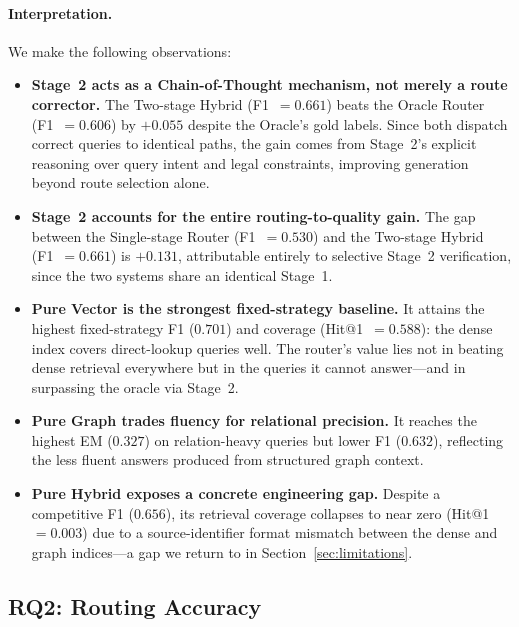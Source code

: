 ﻿\documentclass[11pt,twocolumn]{article}
\begin{document}
\paragraph{Interpretation.}
We make the following observations:
\begin{itemize}
  \item \textbf{Stage~2 acts as a Chain-of-Thought mechanism, not merely
  a route corrector.} The Two-stage Hybrid (F1~$=0.661$) beats the
  Oracle Router (F1~$=0.606$) by $+0.055$ despite the Oracle's gold labels.
  Since both dispatch correct queries to identical paths, the gain comes
  from Stage~2's explicit reasoning over query intent and legal
  constraints, improving generation beyond route selection alone.

  \item \textbf{Stage~2 accounts for the entire routing-to-quality gain.}
  The gap between the Single-stage Router (F1~$=0.530$) and the Two-stage
  Hybrid (F1~$=0.661$) is $+0.131$, attributable entirely to selective
  Stage~2 verification, since the two systems share an identical Stage~1.

  \item \textbf{Pure Vector is the strongest fixed-strategy baseline.}
  It attains the highest fixed-strategy F1 ($0.701$) and coverage
  (Hit@1~$=0.588$): the dense index covers direct-lookup queries well. The
  router's value lies not in beating dense retrieval everywhere but in the
  queries it cannot answer---and in surpassing the oracle via Stage~2.

  \item \textbf{Pure Graph trades fluency for relational precision.} It
  reaches the highest EM ($0.327$) on relation-heavy queries but lower
  F1 ($0.632$), reflecting the less fluent answers produced from
  structured graph context.

  \item \textbf{Pure Hybrid exposes a concrete engineering gap.} Despite
  a competitive F1 ($0.656$), its retrieval coverage collapses to near
  zero (Hit@1~$=0.003$) due to a source-identifier format mismatch between
  the dense and graph indices---a gap we return to in
  Section~\ref{sec:limitations}.
\end{itemize}

\subsection{RQ2: Routing Accuracy}
\label{subsec:rq2}
\end{document}
